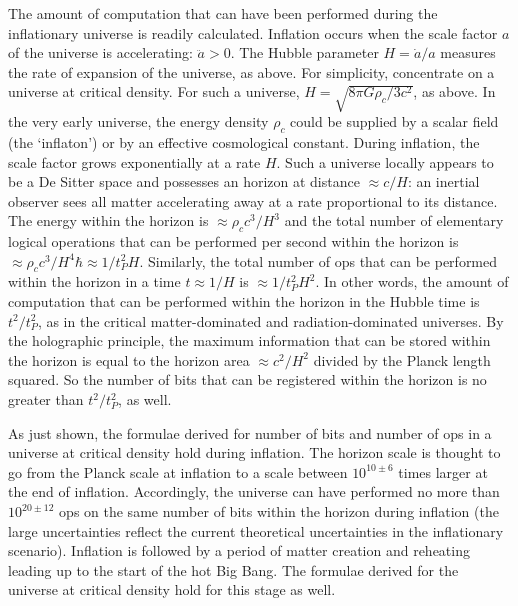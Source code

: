 The amount of computation that can have been performed during the inflationary
universe is readily calculated.  Inflation occurs when the scale
factor $a$ of the universe is accelerating: $\ddot a > 0$.
The Hubble parameter $H = \dot a/a$ measures the rate of expansion
of the universe, as above.  For simplicity, concentrate on a
universe at critical density.  For such a universe, 
$H = \sqrt{8\pi G \rho_c/3c^2}$, as above.  In the very early universe,
the energy density $\rho_c$ could be supplied by a scalar field
(the `inflaton') or by an effective cosmological constant.  During
inflation, the scale factor grows exponentially at a rate $H$.
Such a universe locally appears to be a De Sitter space and possesses
an horizon at distance $\approx c/H$: an inertial observer sees all matter
accelerating away at a rate proportional to its distance.  The energy
within the horizon is $\approx \rho_c c^3/H^3$ and the total number
of elementary logical operations that can be performed per second
within the horizon is $\approx \rho_c c^3/H^4 \hbar \approx  1/ t_P^2 H$.  
Similarly, the total
number of ops that can be performed within the horizon in a time
$t\approx 1/H$ is $ \approx 1/ t_P^2 H^2$.  In other words,
the amount of computation that can be performed within
the horizon in the Hubble time is $t^2/ t_P^2 $, as in the critical 
matter-dominated and radiation-dominated universes.
By the holographic principle, the maximum information that can be stored 
within the horizon is equal to the horizon area $\approx c^2/H^2$ divided 
by the Planck length squared.  So the number of bits that can be registered
within the horizon is no greater than $t^2/t_P^2 $, as well. 

As just shown, the formulae derived for number of bits and number of
ops in a universe at critical density hold during inflation.
The horizon scale is thought to go from the Planck scale at inflation
to a scale between $10^{10\pm 6}$ times larger at the end of inflation.
Accordingly, the universe can have performed no more than $10^{20\pm 12}$
ops on the same number of bits within the horizon during inflation (the
large uncertainties reflect the current theoretical uncertainties in
the inflationary scenario).  Inflation is followed by a period
of matter creation and reheating leading up to the start of the hot
Big Bang.  The formulae derived for the universe at critical density
hold for this stage as well.

